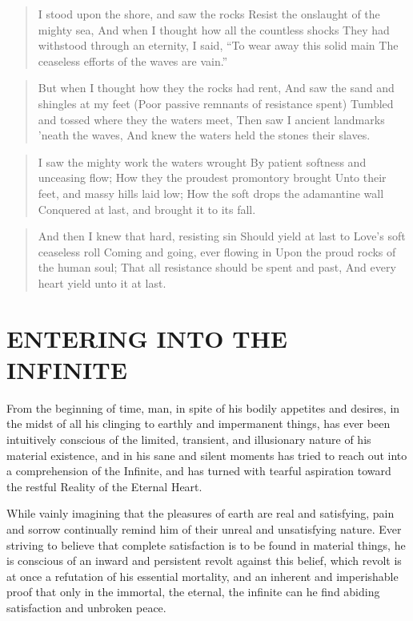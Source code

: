\documentclass[12pt,oneside]{scrbook}
\begin{document}
  \begin{quote}
  I stood upon the shore, and saw the rocks Resist the onslaught of the
  mighty sea, And when I thought how all the countless shocks They had
  withstood through an eternity, I said, ``To wear away this solid main
  The ceaseless efforts of the waves are vain.''
  \end{quote}
  
  \begin{quote}
  But when I thought how they the rocks had rent, And saw the sand and
  shingles at my feet (Poor passive remnants of resistance spent) Tumbled
  and tossed where they the waters meet, Then saw I ancient landmarks
  'neath the waves, And knew the waters held the stones their slaves.
  \end{quote}
  
  \begin{quote}
  I saw the mighty work the waters wrought By patient softness and
  unceasing flow; How they the proudest promontory brought Unto their
  feet, and massy hills laid low; How the soft drops the adamantine wall
  Conquered at last, and brought it to its fall.
  \end{quote}
  
  \begin{quote}
  And then I knew that hard, resisting sin Should yield at last to Love's
  soft ceaseless roll Coming and going, ever flowing in Upon the proud
  rocks of the human soul; That all resistance should be spent and past,
  And every heart yield unto it at last.
  \end{quote}
  
  \section{ENTERING INTO THE INFINITE}\label{entering-into-the-infinite}
  
  From the beginning of time, man, in spite of his bodily appetites and
  desires, in the midst of all his clinging to earthly and impermanent
  things, has ever been intuitively conscious of the limited, transient,
  and illusionary nature of his material existence, and in his sane and
  silent moments has tried to reach out into a comprehension of the
  Infinite, and has turned with tearful aspiration toward the restful
  Reality of the Eternal Heart.
  
  While vainly imagining that the pleasures of earth are real and
  satisfying, pain and sorrow continually remind him of their unreal and
  unsatisfying nature. Ever striving to believe that complete satisfaction
  is to be found in material things, he is conscious of an inward and
  persistent revolt against this belief, which revolt is at once a
  refutation of his essential mortality, and an inherent and imperishable
  proof that only in the immortal, the eternal, the infinite can he find
  abiding satisfaction and unbroken peace.
  
\end{document}
